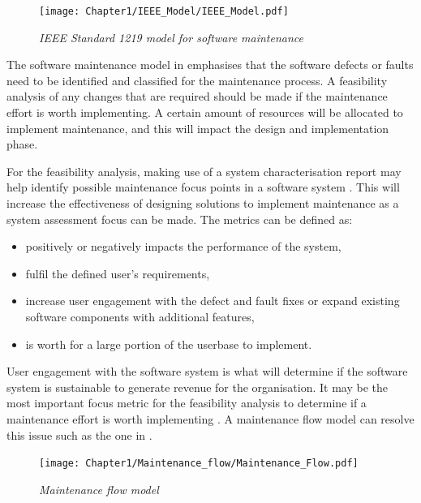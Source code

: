 \begin{figure}[!htb]
	\centering %
	\texttt{[image: Chapter1/IEEE\_Model/IEEE\_Model.pdf]}
	\caption[IEEE Standard 1219 model for software maintenance]
	{\textit{IEEE Standard 1219 model for software maintenance \cite{Ren2011}}} \label{fig:ch1_ieeeModel}
\end{figure}

The software maintenance model in  emphasises that the software defects or faults need to be identified and classified for the maintenance process. A feasibility analysis of any changes that are required should be made if the maintenance effort is worth implementing. A certain amount of resources will be allocated to implement maintenance, and this will impact the design and implementation phase.\par For the feasibility analysis, making use of a system characterisation report may help identify possible maintenance focus points in a software system \cite{Araujo2021}. This will increase the effectiveness of designing solutions to implement maintenance as a system assessment focus can be made. The metrics can be defined as:

\begin{itemize}
	\item positively or negatively impacts the performance of the system,
	\item fulfil the defined user's requirements,
	\item increase user engagement with the defect and fault fixes or expand existing software components with additional features,
	\item is worth for a large portion of the userbase to implement.
\end{itemize}

User engagement with the software system is what will determine if the software system is sustainable to generate revenue for the organisation. It may be the most important focus metric for the feasibility analysis to determine if a maintenance effort is worth implementing \cite{Araujo2021}. A maintenance flow model can resolve this issue such as the one in .  

\begin{figure}[!htb]
	\centering %
	\texttt{[image: Chapter1/Maintenance\_flow/Maintenance\_Flow.pdf]}
	\caption[Maintenance flow model]
	{\textit{Maintenance flow model \cite{Tang2010}}} \label{fig:ch1_maintenanceFlow}
\end{figure}

